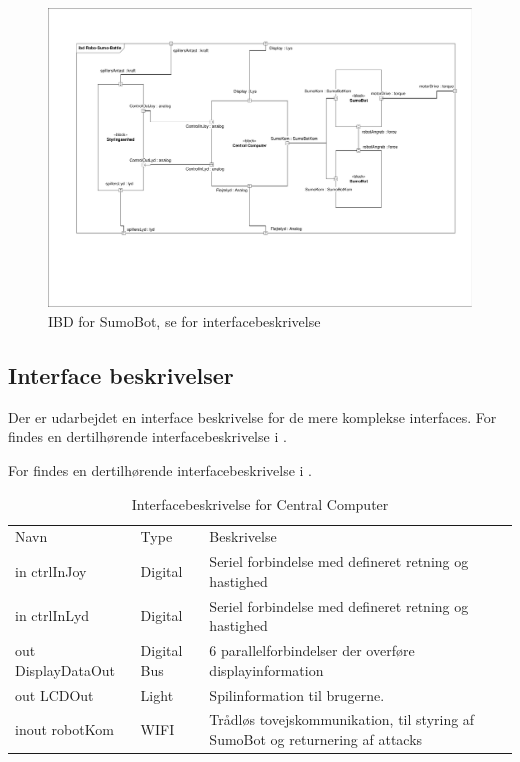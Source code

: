 \begin{figure}
	\centering
   	\includegraphics[page=4,width=1\linewidth]{figs/Diagrammer/IBD.pdf}
	\caption{IBD for SumoBot, se  for interfacebeskrivelse}
	\label{fig:IBD_SumoBot}
\end{figure}

\subsection{Interface beskrivelser}
\noindent Der er udarbejdet en interface beskrivelse for de mere komplekse interfaces. For  findes en dertilhørende interfacebeskrivelse i  .

\noindent For  findes en dertilhørende interfacebeskrivelse i .

\begin{table}[]
    \centering
    \caption{Interfacebeskrivelse for Central Computer}
    \label{tab:interface_table_CentralComputer}
    \begin{tabular}{lp{5cm}p{7cm}}\toprule
        Navn              & Type       & Beskrivelse\\                                                                                                                                 
        in ctrlInJoy        & Digital    & Seriel forbindelse med defineret retning og hastighed\\
        in ctrlInLyd        & Digital    & Seriel forbindelse med defineret retning og hastighed\\     
        out DisplayDataOut  & Digital Bus     & 6 parallelforbindelser der overføre displayinformation\\
        out LCDOut                & Light    & Spilinformation til brugerne.\\
        inout robotKom       & WIFI              & Trådløs tovejskommunikation, til styring af SumoBot  og returnering af attacks\\
        \bottomrule
    \end{tabular}%
\end{table}

